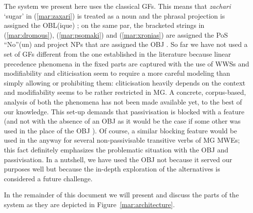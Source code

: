 \documentclass[output=paper]{langsci/langscibook}
\begin{document}
The system we present here uses the classical  GFs. This means that \textit{zachari} `sugar' in (\ref{mar:zaxari}) is treated as a noun and the phrasal projection is assigned the OBL(ique) ; on the same par, the bracketed strings in (\ref{mar:dromous}), (\ref{mar:psomaki}) and (\ref{mar:xronias}) are assigned the PoS ``No''(un) and project NPs that are assigned the OBJ . So far we have not used a set of GFs different from the one established in the literature because linear precedence phenomena in the fixed parts are captured with the use of WWSs and modifiability and cliticisation seem to require a more careful modeling than simply allowing or prohibiting them: cliticisation heavily depends on the context and modifiability seems to be rather restricted in MG.  A concrete, corpus-based, analysis of both the phenomena has not been made available yet, to the best of our knowledge. This set-up demands that passivisation is blocked with a feature (and not with the absence of an OBJ  as it would be the case if some other  was used in the place of the OBJ ). Of course, a similar blocking feature would be used in the  anyway for several non-passivisable transitive verbs of MG MWEs; this fact definitely emphasizes the problematic situation with the OBJ  and passivisation. In a nutshell, we have used the OBJ  not because it served our purposes well but because the in-depth exploration of the alternatives is considered a future challenge.

In the remainder of this document we will present and discuss the parts of the system as they are depicted in Figure~\ref{mar:architecture}. 
\end{document}

